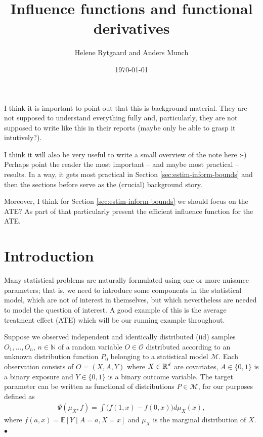 \documentclass[a4,danish]{article}
\title{Influence functions and functional derivatives}
\author{Helene Rytgaard and Anders Munch}
\date{\today}
\newcommand\xqed[1]{%
  \leavevmode\unskip\penalty9999 \hbox{}\nobreak\hfill
  \quad\hbox{#1}}
\newcommand\xend{\xqed{\(\bullet\)}}
\newcommand{\EE}{\mathbb{E}}
\begin{document}
\maketitle



I think it is important to point out that this is background
material. They are not supposed to understand everything fully and,
particularly, they are not supposed to write like this in their
reports (maybe only be able to grasp it intutively?). 

I think it will also be very useful to write a small overview of the
note here :-) Perhaps point the reader the most important -- and maybe
most practical -- results. In a way, it gets most practical in Section
\ref{sec:estim-inform-bounds} and then the sections before serve as
the (crucial) background story.


Moreover, I think for Section \ref{sec:estim-inform-bounds} we should
focus on the ATE? As part of that particularly present the efficient
influence function for the ATE.


\section{Introduction}
\label{sec:introduction}




Many statistical problems are naturally formulated using one or more
nuisance parameters; that is, we need to introduce some components in
the statistical model, which are not of interest in themselves, but
which nevertheless are needed to model the question of interest. A
good example of this is the average treatment effect (ATE) which will
be our running example throughout.

\begin{example}[ATE]
  Suppose we observed independent and identically distributed (iid)
  samples \(O_1,\ldots,O_n\), \(n\in\mathbb{N}\) of a random variable
  \(O \in\mathcal{O}\) distributed according to an unknown
  distribution function \(P_0\) belonging to a statistical model
  \(\mathcal{M}\). Each observation consists of \(O= (X, A, Y)\) where
  \(X\in \mathbb{R}^d\) are covariates, \(A\in \lbrace 0,1\rbrace\) is a
  binary exposure and \(Y\in\lbrace 0, 1\rbrace\) is a binary outcome
  variable. The target parameter can be written as functional
   of
  distributions \(P\in\mathcal{M}\), for our purposes defined as
\begin{align}
  \Psi( \mu_X, f) = \int \big( f( 1, x) - f(0, x) \big) d\mu_X (x), 
  \label{eq:Psi:ate}
\end{align}
where \(f (a, x) = \EE [ Y \mid A=a, X=x]\) and \(\mu_X \) is the
marginal distribution of \(X\).
\xend
\end{example}
\end{document}
